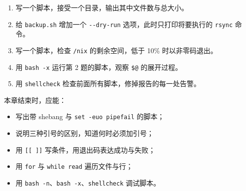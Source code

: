 \begin{enumerate}
  \item 写一个脚本，接受一个目录，输出其中文件数与总大小。
  \item 给 \texttt{backup.sh} 增加一个 \texttt{-{}-dry-run} 选项，此时只打印将要执行的 \texttt{rsync} 命令。
  \item 写一个脚本，检查 \texttt{/nix} 的剩余空间，低于 10\% 时以非零码退出。
  \item 用 \texttt{bash -x} 运行第 2 题的脚本，观察 \texttt{\$@} 的展开过程。
  \item 用 \texttt{shellcheck} 检查前面所有脚本，修掉报告的每一处告警。
\end{enumerate}

\begin{checkpoint}
本章结束时，应能：
\begin{itemize}
  \item 写出带 shebang 与 \texttt{set -euo pipefail} 的脚本；
  \item 说明三种引号的区别，知道何时必须加引号；
  \item 用 \texttt{[[ ]]} 写条件，用退出码表达成功与失败；
  \item 用 \texttt{for} 与 \texttt{while read} 遍历文件与行；
  \item 用 \texttt{bash -n}、\texttt{bash -x}、\texttt{shellcheck} 调试脚本。
\end{itemize}
\end{checkpoint}
